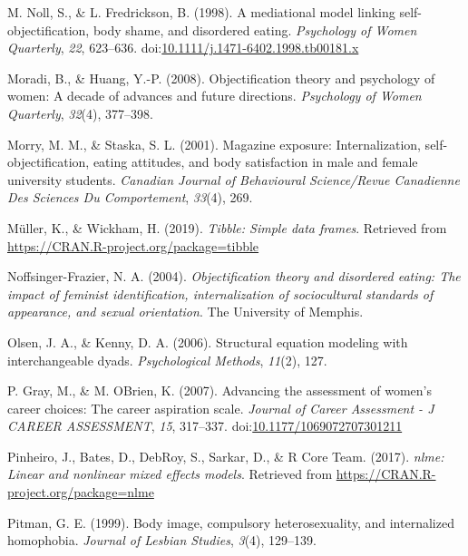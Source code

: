 \documentclass[
  man]{apa6}
\begin{document}
\leavevmode\hypertarget{ref-nollfredrickson1998}{}%
M. Noll, S., \& L. Fredrickson, B. (1998). A mediational model linking self-objectification, body shame, and disordered eating. \emph{Psychology of Women Quarterly}, \emph{22}, 623--636. doi:\href{https://doi.org/10.1111/j.1471-6402.1998.tb00181.x}{10.1111/j.1471-6402.1998.tb00181.x}

\leavevmode\hypertarget{ref-moradi2008}{}%
Moradi, B., \& Huang, Y.-P. (2008). Objectification theory and psychology of women: A decade of advances and future directions. \emph{Psychology of Women Quarterly}, \emph{32}(4), 377--398.

\leavevmode\hypertarget{ref-morry2001magazine}{}%
Morry, M. M., \& Staska, S. L. (2001). Magazine exposure: Internalization, self-objectification, eating attitudes, and body satisfaction in male and female university students. \emph{Canadian Journal of Behavioural Science/Revue Canadienne Des Sciences Du Comportement}, \emph{33}(4), 269.

\leavevmode\hypertarget{ref-R-tibble}{}%
Müller, K., \& Wickham, H. (2019). \emph{Tibble: Simple data frames}. Retrieved from \url{https://CRAN.R-project.org/package=tibble}

\leavevmode\hypertarget{ref-noffsinger2004objectification}{}%
Noffsinger-Frazier, N. A. (2004). \emph{Objectification theory and disordered eating: The impact of feminist identification, internalization of sociocultural standards of appearance, and sexual orientation}. The University of Memphis.

\leavevmode\hypertarget{ref-olsen2006structural}{}%
Olsen, J. A., \& Kenny, D. A. (2006). Structural equation modeling with interchangeable dyads. \emph{Psychological Methods}, \emph{11}(2), 127.

\leavevmode\hypertarget{ref-grayobrien2007}{}%
P. Gray, M., \& M. OBrien, K. (2007). Advancing the assessment of women's career choices: The career aspiration scale. \emph{Journal of Career Assessment - J CAREER ASSESSMENT}, \emph{15}, 317--337. doi:\href{https://doi.org/10.1177/1069072707301211}{10.1177/1069072707301211}

\leavevmode\hypertarget{ref-R-nlme}{}%
Pinheiro, J., Bates, D., DebRoy, S., Sarkar, D., \& R Core Team. (2017). \emph{nlme: Linear and nonlinear mixed effects models}. Retrieved from \url{https://CRAN.R-project.org/package=nlme}

\leavevmode\hypertarget{ref-pitman1999body}{}%
Pitman, G. E. (1999). Body image, compulsory heterosexuality, and internalized homophobia. \emph{Journal of Lesbian Studies}, \emph{3}(4), 129--139.
\end{document}
